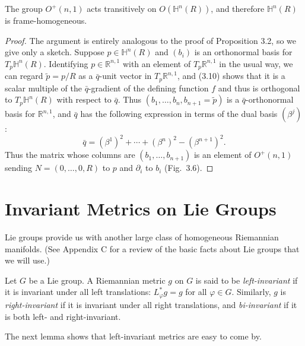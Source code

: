 \begin{proposition}
\label{prop:lorentz-group-transitive}

The group $O^+(n,1)$ acts transitively on $O(\mathbb{H}^n(R))$, and therefore
$\mathbb{H}^n(R)$ is frame-homogeneous.
\end{proposition}

\begin{proof}
The argument is entirely analogous to the proof of Proposition 3.2, so we
give only a sketch. Suppose $p \in \mathbb{H}^n(R)$ and $(b_i)$ is an orthonormal basis for
$T_p \mathbb{H}^n(R)$. Identifying $p \in \mathbb{R}^{n,1}$ with an element of $T_p \mathbb{R}^{n,1}$ in the usual way, we
can regard $\tilde{p} = p/R$ as a $\bar{q}$-unit vector in $T_p \mathbb{R}^{n,1}$, and (3.10) shows that it is a
scalar multiple of the $\bar{q}$-gradient of the defining function $f$ and thus is orthogonal
to $T_p \mathbb{H}^n(R)$ with respect to $\bar{q}$. Thus $(b_1, \ldots, b_n, b_{n+1} = \tilde{p})$ is a $\bar{q}$-orthonormal basis
for $\mathbb{R}^{n,1}$, and $\bar{q}$ has the following expression in terms of the dual basis $(\beta^j)$:
\[
\bar{q} = (\beta^1)^2 + \cdots + (\beta^n)^2 - (\beta^{n+1})^2.
\]
Thus the matrix whose columns are $(b_1, \ldots, b_{n+1})$ is an element of $O^+(n, 1)$ sending
$N = (0, \ldots, 0, R)$ to $p$ and $\partial_i$ to $b_i$ (Fig.~3.6).
\end{proof}

\section{Invariant Metrics on Lie Groups}

Lie groups provide us with another large class of homogeneous Riemannian manifolds. (See Appendix C for a review of the basic facts about Lie groups that we will
use.)

Let $G$ be a Lie group. A Riemannian metric $g$ on $G$ is said to be \emph{left-invariant}
if it is invariant under all left translations: $L_\varphi^* g = g$ for all $\varphi \in G$. Similarly, $g$ is
\emph{right-invariant} if it is invariant under all right translations, and \emph{bi-invariant} if it is
both left- and right-invariant.


The next lemma shows that left-invariant metrics are easy to come by.

